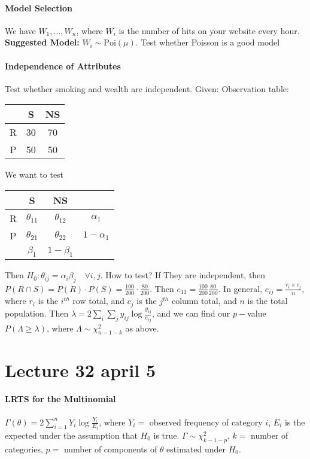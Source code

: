 \documentclass[10pt,letter]{article}
\theoremstyle{plain}
\theoremstyle{definition}
\begin{document}
\paragraph{Model Selection}
We have $W_1,\ldots,W_n$, where $W_i$ is the number of hits on your website every hour. \textbf{Suggested Model:} $W_i\sim\text{Poi}(\mu)$. Test whether Poisson is a good model

\paragraph{Independence of Attributes}
Test whether smoking and wealth are independent. Given: 
Observation table:
\begin{tabular}{|c|c|c|}\hline
&S&NS\\\hline
R&30&70\\\hline
P&50&50\\\hline
\end{tabular}
We want to test \begin{tabular}{|c|c|c|c|}\hline
&S&NS\\\hline
R&$\theta_{11}$&$\theta_{12}$&$\alpha_1$\\\hline
P&$\theta_{21}$&$\theta_{22}$&$1-\alpha_1$\\\hline
&$\beta_1$&$1-\beta_1$&\\\hline
\end{tabular}
Then $H_0:\theta_{ij}=\alpha_i\beta_j\quad\forall i,j$. How to test? If They are independent, then $P(R\cap S)=P(R)\cdot P(S)=\frac{100}{200}\cdot\frac{80}{200}$. Then $e_{11}=\frac{100}{200}\frac{80}{200}$. In general, $e_{ij}=\frac{r_i\times c_j}{n}$, where $r_i$ is the $i^{th}$ row total, and $c_j$ is the $j^{th}$ column total, and $n$ is the total population. Then $\lambda=2\sum_{i}\sum_j y_{ij}\log\frac{y_{ij}}{e_{ij}}$, and we can find our $p-$value $P(\Lambda\geq\lambda)$, where $\Lambda\sim\chi^2_{n-1-k}$ as above. 


\section*{Lecture 32 april 5}
\paragraph{LRTS for the Multinomial}
$\Gamma(\theta)=2\sum_{i=1}^n Y_i\log\frac{Y_i}{E_i}$, where $Y_i=$ observed frequency of category $i$, $E_i$ is the expected under the assumption that $H_0$ is true. $\Gamma\sim\chi^2_{k-1-p}$, $k=$ number of categories, $p=$ number of components of $\theta$ estimated under $H_0$. 
\end{document}
